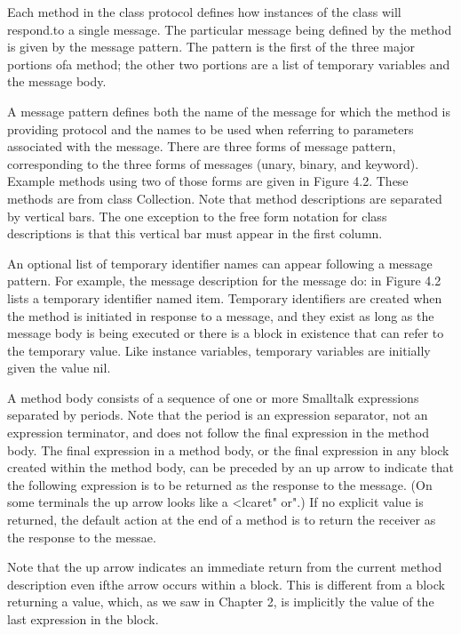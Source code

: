 Each method in the class protocol defines how instances of the class
will respond.to a single message. The particular message being defined by
the method is given by the message pattern. The pattern is the first of the
three major portions ofa method; the other two portions are a list of
temporary variables and the message body.


A message pattern defines both the name of the message for which the
method is providing protocol and the names to be used when referring to
parameters associated with the message. There are three forms of message
pattern, corresponding to the three forms of messages (unary, binary, and
keyword). Example methods using two of those forms are given in Figure
4.2. These methods are from class Collection. Note that method descriptions are separated by vertical bars. The one exception to the free form
notation for class descriptions is that this vertical bar must appear in the
first column.

An optional list of temporary identifier names can appear following a
message pattern. For example, the message description for the message
do: in Figure 4.2 lists a temporary identifier named item. Temporary identifiers are created when the method is initiated in response to a message,
and they exist as long as the message body is being executed or there is a
block in existence that can refer to the temporary value. Like instance
variables, temporary variables are initially given the value nil.

A method body consists of a sequence of one or more Smalltalk expressions separated by periods. Note that the period is an expression separator,
not an expression terminator, and does not follow the final expression in
the method body. The final expression in a method body, or the final
expression in any block created within the method body, can be preceded
by an up arrow to indicate that the following expression is to be returned
as the response to the message. (On some terminals the up arrow looks
like a <lcaret" or".) If no explicit value is returned, the default action at the
end of a method is to return the receiver as the response to the messae.


\clearpage\noindent
Note that the up arrow indicates an immediate return from the current
method description even ifthe arrow occurs within a block. This is different
from a block returning a value, which, as we saw in Chapter 2, is implicitly
the value of the last expression in the block.

